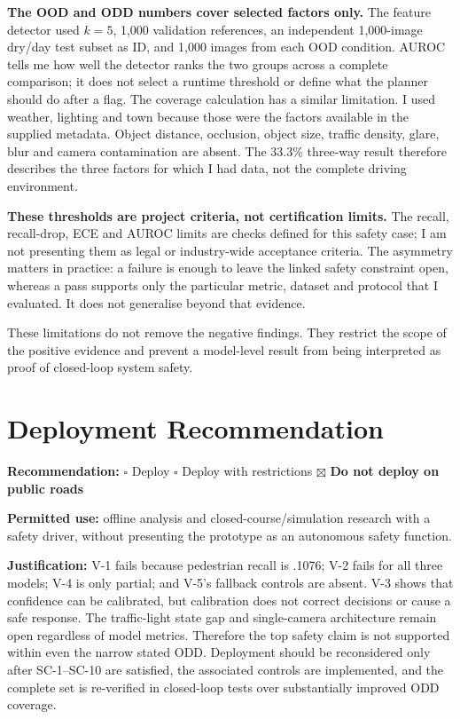 \documentclass[nologo,a4paper,12pt]{article}
\begin{document}
\textbf{The OOD and ODD numbers cover selected factors only.} The feature detector used $k=5$,
1,000 validation references, an independent 1,000-image dry/day test subset as ID, and 1,000 images
from each OOD condition. AUROC tells me how well the detector ranks the two groups across a complete
comparison; it does not select a runtime threshold or define what the planner should do after a flag.
The coverage calculation has a similar limitation. I used weather, lighting and town because those
were the factors available in the supplied metadata. Object distance, occlusion, object size, traffic
density, glare, blur and camera contamination are absent. The 33.3\% three-way result therefore
describes the three factors for which I had data, not the complete driving environment.

\textbf{These thresholds are project criteria, not certification limits.} The recall, recall-drop,
ECE and AUROC limits are checks defined for this safety case; I am not presenting them as legal or
industry-wide acceptance criteria. The asymmetry matters in practice: a failure is enough to leave
the linked safety constraint open, whereas a pass supports only the particular metric, dataset and
protocol that I evaluated. It does not generalise beyond that evidence.

These limitations do not remove the negative findings. They restrict the scope of the positive
evidence and prevent a model-level result from being interpreted as proof of closed-loop system
safety.

\clearpage
\section{Deployment Recommendation}
\label{sec:deployment}

\begin{mdframed}[style=subclaim]
\textbf{Recommendation:}\quad
$\square$ Deploy \quad $\square$ Deploy with restrictions \quad
$\boxtimes$ \textbf{Do not deploy on public roads}

\medskip
\textbf{Permitted use:} offline analysis and closed-course/simulation research with a safety driver,
without presenting the prototype as an autonomous safety function.

\medskip
\textbf{Justification:} V-1 fails because pedestrian recall is .1076; V-2 fails for all three
models; V-4 is only partial; and V-5's fallback controls are absent. V-3 shows that confidence can
be calibrated, but calibration does not correct decisions or cause a safe response. The traffic-light
state gap and single-camera architecture remain open regardless of model metrics. Therefore the top
safety claim is not supported within even the narrow stated ODD. Deployment should be reconsidered
only after SC-1--SC-10 are satisfied, the associated controls are implemented, and the complete
set is re-verified in closed-loop tests over substantially improved ODD coverage.
\end{mdframed}
\end{document}
